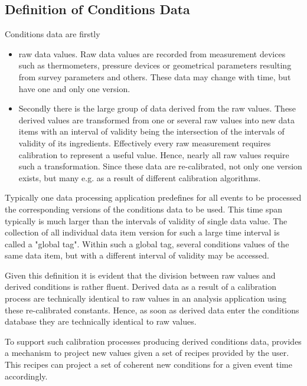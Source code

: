 \documentclass[10pt,a4paper]{article}
\begin{document}
\subsection{Definition of Conditions Data}
\label{subsec:ddcond-conditions-data}
\noindent
Conditions data are firstly
\begin{itemize}
\item raw data values. Raw data values are recorded from measurement 
      devices such as 
      thermometers, pressure devices or 
      geometrical parameters resulting
      from survey parameters and others.
      These data may change with time, but have one and only one version.
\item Secondly there is the large group of data derived from the raw values.
      These derived values are transformed from one or several raw values
      into new data items with an interval of validity being the
      intersection of the intervals of validity of its ingredients.
      Effectively every raw measurement requires calibration to represent
      a useful value. Hence, nearly all raw values require such a 
      transformation. Since these data are re-calibrated, not only one version
      exists, but many e.g. as a result of different calibration algorithms. 
\end{itemize}
Typically one data processing application predefines for all events 
to be processed the corresponding versions of the conditions data to be used.
This time span typically is much larger than the intervals of validity 
of single data value.
The collection of all individual data item version for such a large time interval
is called a "global tag".
Within such a global tag, several conditions values of the same data item, but 
with a different interval of validity may be accessed.

\noindent
Given this definition it is evident that the division between raw values 
and derived conditions is rather fluent. Derived data as a result of
a calibration process are technically identical to raw values in an
analysis application using these re-calibrated constants.
Hence, as soon as derived data enter the conditions database they are 
technically identical to raw values.

\noindent
To support such calibration processes producing derived conditions 
data, \DDC provides a mechanism to project new values given 
a set of recipes provided by the user. This recipes can project a 
set of coherent new conditions for a given event time accordingly.
\end{document}
